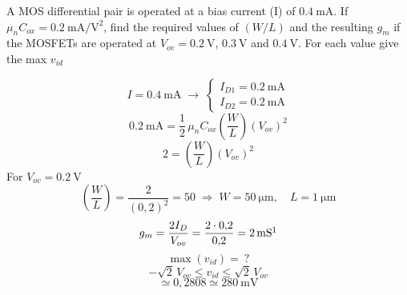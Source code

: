 \documentclass[11pt,a4paper]{article}
\begin{document}
\begin{ornek}[3]
A MOS differential pair is operated at a bias current (I) of $\qty{0,4}{\milli\ampere}$. If $\mu_n C_{ox} = \qty{0,2}{\milli\ampere\per\volt\squared}$, find the required values of $(W/L)$ and the resulting $g_m$ if the MOSFETs are operated at $V_{ov} = \qty{0,2}{\volt}$, $\qty{0,3}{\volt}$ and $\qty{0,4}{\volt}$. For each value give the max $v_{id}$
\end{ornek}
\begin{cozum}
\[ I = \qty{0,4}{\milli\ampere} \;\rightarrow\; \begin{cases} I_{D1} = \qty{0,2}{\milli\ampere} \\ I_{D2} = \qty{0,2}{\milli\ampere} \end{cases} \]
\[ \qty{0,2}{\milli\ampere} = \frac{1}{2}\,\mu_n C_{ox}\left(\frac{W}{L}\right)(V_{ov})^2 \]
\[ 2 = \left(\frac{W}{L}\right)(V_{ov})^2 \]
For $V_{ov} = \qty{0,2}{\volt}$
\[ \left(\frac{W}{L}\right) = \frac{2}{(0{,}2)^2} = 50 \;\Rightarrow\; W = \qty{50}{\micro\meter}, \quad L = \qty{1}{\micro\meter} \]
\[ g_m = \frac{2I_D}{V_{ov}} = \frac{2 \cdot 0{,}2}{0{,}2} = \qty{2}{\milli\siemens}\footnotemark \]
\[ \max(v_{id}) = \ ? \]
\[ -\sqrt{2}\,V_{ov} \leq v_{id} \leq \sqrt{2}\,V_{ov} \]
\[ \simeq 0{,}2808 \simeq \qty{280}{\milli\volt} \]
\end{cozum}
\end{document}
